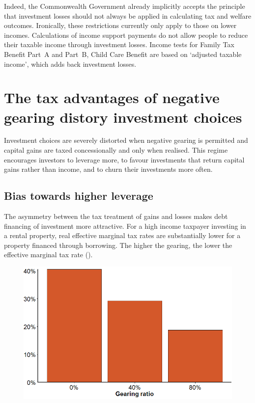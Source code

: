 \documentclass{grattan}\usepackage[]{graphicx}\usepackage[]{color}
\begin{document}
Indeed, the Commonwealth Government already implicitly accepts the principle that investment losses should not always be applied in calculating tax and welfare outcomes. Ironically, these restrictions currently only apply to those on lower incomes. Calculations of income support payments do not allow people to reduce their taxable income through investment losses. Income tests for Family Tax Benefit Part~A and Part~B, Child Care Benefit are based on `adjusted taxable income', which adds back investment losses. 

\section{The tax advantages of negative gearing distory investment choices}
Investment choices are severely distorted when negative gearing is permitted and capital gains are taxed concessionally and only when realised. This regime encourages investors to leverage more, to favour investments that return capital gains rather than income, and to churn their investments more often.

\subsection{Bias towards higher leverage}
The asymmetry between the tax treatment of gains and losses makes debt financing of investment more attractive. For a high income taxpayer investing in a rental property, real effective marginal tax rates are substantially lower for a property financed through borrowing. The higher the gearing, the lower the effective marginal tax rate (). 



\begin{figure}

\includegraphics[width=\columnwidth]{CGT-NG-atlas//EMTR-by-gearing-1}

\end{figure}
\end{document}
